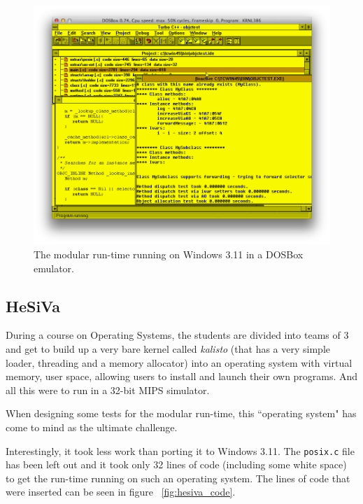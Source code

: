 \begin{figure}
  \includegraphics[width=\textwidth]{img/dos_box_3_11.png}
  
  \centering{}
  \caption{The modular run-time running on Windows 3.11 in a DOSBox emulator.}
  \label{fig:win_3_11}
\end{figure}

\subsection{HeSiVa}

During a course on Operating Systems, the students are divided into teams of 3 and get to build up a very bare kernel called \emph{kalisto} (that has a very simple loader, threading and a memory allocator) into an operating system with virtual memory, user space, allowing users to install and launch their own programs. And all this were to run in a 32-bit MIPS simulator.

When designing some tests for the modular run-time, this ``operating system" has come to mind as the ultimate challenge.

Interestingly, it took less work than porting it to Windows 3.11. The \verb=posix.c= file has been left out and it took only 32 lines of code (including some white space) to get the run-time running on such an operating system. The lines of code that were inserted can be seen in figure ~\ref{fig:hesiva_code}.

